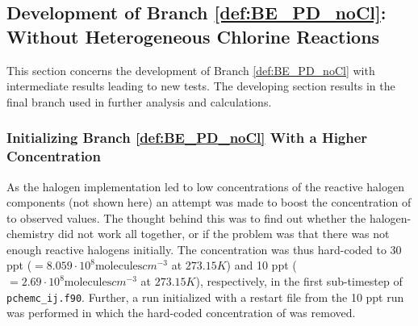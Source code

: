 %









%


\subsection{Development of Branch \ref{def:BE_PD_noCl}: Without Heterogeneous Chlorine Reactions}\label{sec:res_noHetCl}

This section concerns the development of Branch \ref{def:BE_PD_noCl} with intermediate results leading to new tests. The developing section results in the final branch used in further analysis and calculations. 

\subsubsection{Initializing Branch \ref{def:BE_PD_noCl} With a Higher  Concentration}\label{sec:res_step2}

As the halogen implementation led to low concentrations of the reactive halogen components (not shown here) an attempt was made to boost the concentration of  to observed values. The thought behind this was to find out whether the halogen-chemistry did not work all together, or if the problem was that there was not enough reactive halogens initially. The concentration was thus hard-coded to 30 ppt ($= 8.059\cdot10^8 \text{molecules}cm^{-3}$ at $273.15 K$) and 10 ppt ($= 2.69\cdot10^8 \text{molecules}cm^{-3}$ at $273.15 K$), respectively, in the first sub-timestep of \texttt{pchemc\_ij.f90}. Further, a run initialized with a restart file from the 10 ppt run was performed in which the hard-coded concentration of  was removed.

